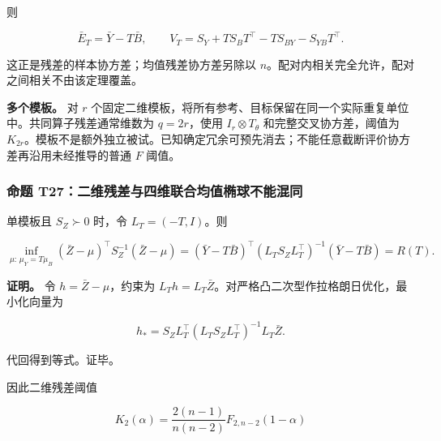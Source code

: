 \documentclass[11pt,a4paper]{article}
\begin{document}
\par
\noindent\begin{minipage}{\linewidth}

则

\[
\bar E_T=\bar Y-T\bar B,\qquad
V_T=S_Y+TS_BT^\top-TS_{BY}-S_{YB}T^\top.
\]

\end{minipage}\par

这正是残差的样本协方差；均值残差协方差另除以
\(n\)。配对内相关完全允许，配对之间相关不由该定理覆盖。

\textbf{多个模板。} 对 \(r\)
个固定二维模板，将所有参考、目标保留在同一个实际重复单位中。共同算子残差通常维数为
\(q=2r\)，使用 \(I_r\otimes T_\theta\) 和完整交叉协方差，阈值为
\(K_{2r}\)。模板不是额外独立被试。已知确定冗余可预先消去；不能任意截断评价协方差再沿用未经推导的普通
\(F\) 阈值。

\subsubsection{命题
T27：二维残差与四维联合均值椭球不能混同}\label{ux547dux9898-t27ux4e8cux7ef4ux6b8bux5deeux4e0eux56dbux7ef4ux8054ux5408ux5747ux503cux692dux7403ux4e0dux80fdux6df7ux540c}

\par
\noindent\begin{minipage}{\linewidth}

单模板且 \(S_Z\succ0\) 时，令 \(L_T=(-T,I)\)。则

\[
\inf_{\mu:\,\mu_Y=T\mu_B}
(\bar Z-\mu)^\top S_Z^{-1}(\bar Z-\mu)
=
(\bar Y-T\bar B)^\top
(L_TS_ZL_T^\top)^{-1}
(\bar Y-T\bar B)
=R(T).
\]

\end{minipage}\par

\par
\noindent\begin{minipage}{\linewidth}

\textbf{证明。} 令 \(h=\bar Z-\mu\)，约束为
\(L_Th=L_T\bar Z\)。对严格凸二次型作拉格朗日优化，最小化向量为

\[
h_*=S_ZL_T^\top(L_TS_ZL_T^\top)^{-1}L_T\bar Z.
\]

\end{minipage}\par

代回得到等式。证毕。

\par
\noindent\begin{minipage}{\linewidth}

因此二维残差阈值

\[
K_2(\alpha)=\frac{2(n-1)}{n(n-2)}F_{2,n-2}(1-\alpha)
\]

\end{minipage}\par
\end{document}
